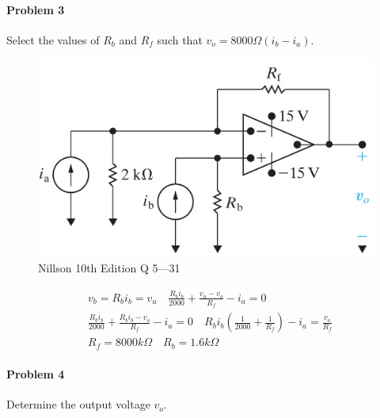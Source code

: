 {\paragraph{Problem 3}
Select the values of $R_b$ and $R_f$ such that $v_o = 8000 \Omega(i_b- i_a)$.
\begin{figure}[H]
	\centering
	\includegraphics[width=1\linewidth]{images/P3Nillson10thQ5_31}
	\caption{Nillson 10th Edition Q 5---31}
	\label{fig:p3nillson10thq531}
\end{figure}
\begin{align*}
& v_b=R_bi_b=v_a \quad  \frac{R_bi_b}{2000}+\frac{v_a-v_o}{R_f}-i_a=0 \\
& \frac{R_bi_b}{2000}+\frac{R_bi_b-v_o}{R_f}-i_a=0 \quad R_bi_b \left(\frac{1}{2000}+\frac{1}{R_f}\right)-i_a=\frac{v_o}{R_f} \\
& R_f = 8000 k \Omega \quad R_b=1.6 k \Omega 
\end{align*}
\paragraph{Problem 4}
Determine the output voltage $v_o$.

}

